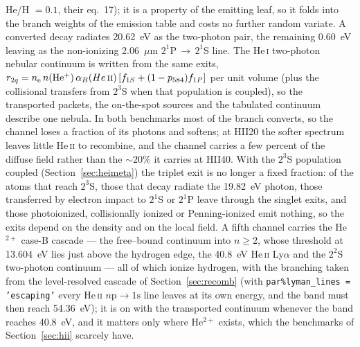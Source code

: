 \documentclass[twocolumn,linenumbers]{aastex702}
\newcommand{\code}[1]{\texttt{#1}}
\newcommand{\HeI}{He\,\textsc{i}}
\newcommand{\HeII}{He\,\textsc{ii}}
\newcommand{\nelec}{n_{\mathrm{e}}}
\begin{document}
He/H $=0.1$, their eq.~17); it is a property of the emitting leaf, so it folds into the
branch weights of the emission table and costs no further random variate.  A
converted decay radiates 20.62~eV as the two-photon pair, the remaining
0.60~eV leaving as the non-ionizing 2.06~$\mu$m $2^1$P\,$\to$\,$2^1$S line.
The \HeI{} two-photon nebular continuum is written from the same exits,
$r_{2q} = \nelec\, n(\mathrm{He^+})\,\alpha_B(\HeII)\,[f_{1S} +
(1-p_{584}) f_{1P}]$ per unit volume (plus the collisional transfers from
$2^3$S when that population is coupled), so the transported packets, the
on-the-spot sources and the tabulated continuum describe one nebula.
In both benchmarks most of the branch converts, so the channel loses a
fraction of its photons and softens; at HII20 the softer spectrum leaves
little \HeII{} to recombine, and the channel carries a few percent of the
diffuse field rather than the $\sim$20\% it carries at HII40.  With the
$2^3$S population coupled (Section~\ref{sec:heimeta}) the triplet exit is
no longer a fixed fraction: of the atoms that reach $2^3$S, those that
decay radiate the 19.82~eV photon, those transferred by electron impact to
$2^1$S or $2^1$P leave through the singlet exits, and those photoionized,
collisionally ionized or Penning-ionized emit nothing, so the exits depend
on the density and on the local field.  A fifth channel carries the
He$^{2+}$ case-B cascade --- the free--bound continuum into $n \ge 2$, whose
threshold at 13.604~eV lies just above the hydrogen edge, the 40.8~eV
\HeII{} Ly$\alpha$ and the $2^2$S two-photon continuum --- all of which
ionize hydrogen, with the branching taken from the level-resolved cascade of
Section~\ref{sec:recomb} (with \code{par\%lyman\_lines = 'escaping'} every
\HeII{} $n\mathrm{p}\to1\mathrm{s}$ line leaves at its own energy, and the
band must then reach 54.36~eV); it is on with the transported continuum
whenever the band reaches 40.8~eV, and it matters only where He$^{2+}$ exists, which the
benchmarks of Section~\ref{sec:hii} scarcely have.
\end{document}
